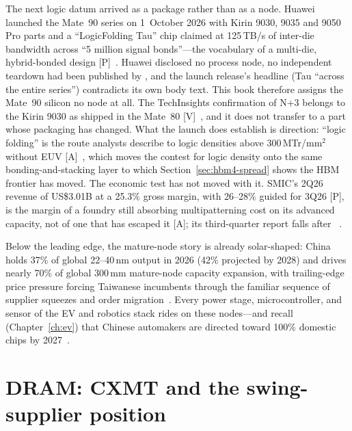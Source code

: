 The next logic datum arrived as a package rather than as a node. Huawei launched the Mate~90 series on 1~October 2026 with Kirin 9030, 9035 and 9050 Pro parts and a ``LogicFolding Tau'' chip claimed at 125\,TB/s of inter-die bandwidth across ``5 million signal bonds''---the vocabulary of a multi-die, hybrid-bonded design [P]~\cite{hw-mate90}. Huawei disclosed no process node, no independent teardown had been published by \datafreeze, and the launch release's headline (Tau ``across the entire series'') contradicts its own body text. This book therefore assigns the Mate~90 silicon no node at all. The TechInsights confirmation of N+3 belongs to the Kirin 9030 as shipped in the Mate~80 [V]~\cite{techinsights-n3}, and it does not transfer to a part whose packaging has changed. What the launch does establish is direction: ``logic folding'' is the route analysts describe to logic densities above 300\,MTr/mm$^2$ without EUV [A]~\cite{hw-mate90}, which moves the contest for logic density onto the same bonding-and-stacking layer to which Section~\ref{sec:hbm4-spread} shows the HBM frontier has moved. The economic test has not moved with it. SMIC's 2Q26 revenue of US\$3.01B at a 25.3\% gross margin, with 26--28\% guided for 3Q26 [P], is the margin of a foundry still absorbing multipatterning cost on its advanced capacity, not of one that has escaped it [A]; its third-quarter report falls after \datafreeze~\cite{hw-smic-2q26}.

Below the leading edge, the mature-node story is already solar-shaped: China holds 37\% of global 22--40\,nm output in 2026 (42\% projected by 2028) and drives nearly 70\% of global 300\,mm mature-node capacity expansion, with trailing-edge price pressure forcing Taiwanese incumbents through the familiar sequence of supplier squeezes and order migration~\cite{mature-node}. Every power stage, microcontroller, and sensor of the EV and robotics stack rides on these nodes---and recall (Chapter~\ref{ch:ev}) that Chinese automakers are directed toward 100\% domestic chips by 2027~\cite{auto-chips}.

\section{DRAM: CXMT and the swing-supplier position}

